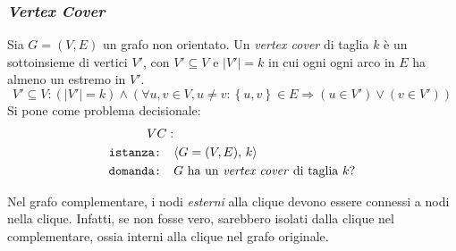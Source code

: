\subsubsection{\emph{Vertex Cover}}

\begin{definition}
    \label{def:vertcov}
    Sia $G=(V,E)$ un grafo non orientato. Un \emph{vertex cover} di taglia $k$ è un sottoinsieme di vertici $V'$, con $V' \subseteq V$ e $|V'| = k$
    in cui ogni ogni arco in $E$ ha almeno un estremo in $V'$.
    \begin{equation*}
        V' \subseteq V : 
        \left( |V'| = k \right)
        \wedge
        \left( 
            \forall u, v \in V, u \ne v :
            \left\{ u,v \right\} \in E
            \Rightarrow
            \left( u \in V' \right) \vee \left( v \in V' \right)
        \right)
    \end{equation*}
Si pone come problema decisionale:
\begin{align*}
    VC: & \\
    \texttt{istanza:} \quad & \langle G=(V,E), \, k \rangle \\
    \texttt{domanda:} \quad & G \text{ ha un \emph{vertex cover} di taglia } k?
\end{align*}
\end{definition}

Nel grafo complementare, i nodi \emph{esterni} alla clique devono essere connessi a nodi nella clique. Infatti, se non fosse vero, sarebbero isolati dalla clique nel complementare, ossia interni alla clique nel grafo originale.

